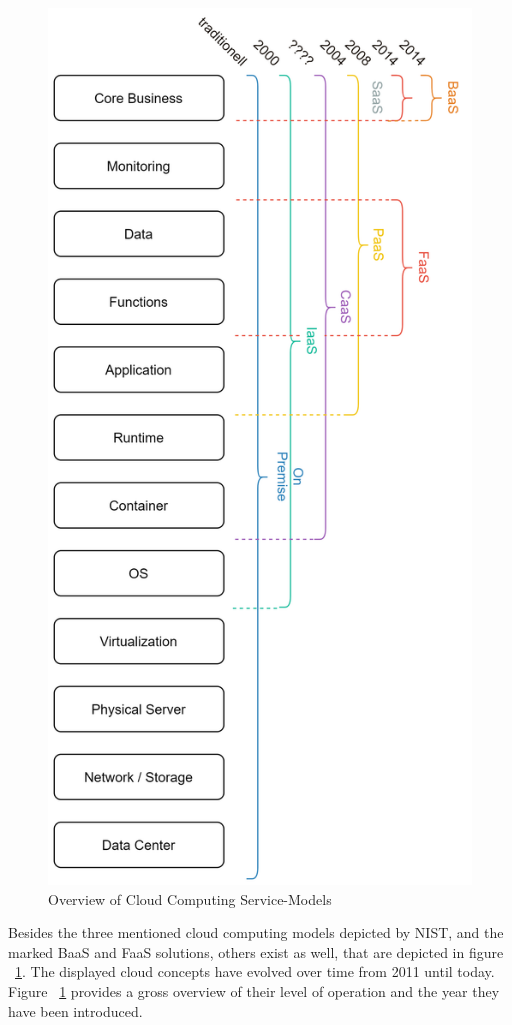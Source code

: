 \documentclass[a4paper,twoside,11pt, pagesize]{scrartcl}
\begin{document}
\begin{spacing}{1.2}
\begin{figure}[H]
\label{fig:cloudComputingConcepts}
\centering
\includegraphics[angle=90,width=1\textwidth]{serviceModels}
\caption{Overview of Cloud Computing Service-Models}
\end{figure}
Besides the three mentioned cloud computing models depicted by NIST, and the marked BaaS and FaaS solutions, others exist as well, that are depicted in figure ~\ref{fig:cloudComputingConcepts}. The displayed cloud concepts have evolved over time from 2011 until today. Figure ~\ref{fig:cloudComputingConcepts} provides a gross overview of their level of operation and the year they have been introduced. 

\end{spacing}
\end{document}
